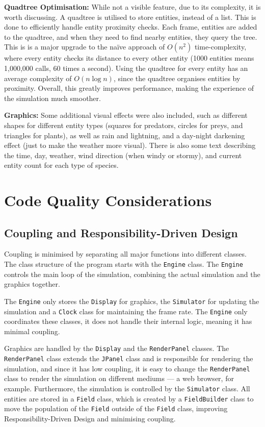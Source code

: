 \documentclass[10pt, a4paper]{scrartcl}
\begin{document}
\begin{multicols}{2}
        \noindent \textbf{Quadtree Optimisation: } While not a visible feature, due to its complexity, it is worth discussing.
        A quadtree is utilised to store entities, instead of a list. This is done to efficiently handle entity proximity checks. Each frame,
        entities are added to the quadtree, and when they need to find nearby entities, they query the tree. This is is a major upgrade
        to the naïve approach of $O(n^2)$ time-complexity, where every entity checks its distance to every other entity (1000 entities means
        1,000,000 calls, 60 times a second). Using the quadtree for every entity has an average complexity of $O(n \log n)$, since the
        quadtree organises entities by proximity. Overall, this greatly improves performance, making the experience of the simulation
        much smoother.

        \noindent \textbf{Graphics: } Some additional visual effects were also included, such as different shapes for different entity types
        (squares for predators, circles for preys, and triangles for plants), as well as rain and lightning, and a day-night darkening effect
        (just to make the weather more visual). There is also some text describing the time, day, weather, wind direction (when windy or
        stormy), and current entity count for each type of species.

        \section{Code Quality Considerations}

        \subsection{Coupling and Responsibility-Driven Design}
        \noindent Coupling is minimised by separating all major functions into different classes. The class structure of the
        program starts with the \verb|Engine| class. The \verb|Engine| controls the main loop of the simulation, combining the actual
        simulation and the graphics together.

        \noindent The \verb|Engine| only stores the \verb|Display| for graphics, the \verb|Simulator| for updating the simulation and a
        \verb|Clock| class for maintaining the frame rate. The \verb|Engine| only coordinates these classes, it does not handle their
        internal logic, meaning it has minimal coupling.

        \noindent Graphics are handled by the \verb|Display| and the \verb|RenderPanel| classes. The \verb|RenderPanel| class 
        extends the \verb|JPanel| class and is responsible for rendering the simulation, and since it has low coupling, it is 
        easy to change the \verb|RenderPanel| class to render the simulation on different mediums — a web browser, for example.
        Furthermore, the simulation is controlled by the
        \verb|Simulator| class. All entities are stored in a \verb|Field| class, which is created by a \verb|FieldBuilder| class to
        move the population of the \verb|Field| outside of the \verb|Field| class, improving Responsibility-Driven Design and
        minimising coupling.


\end{multicols}
\end{document}
